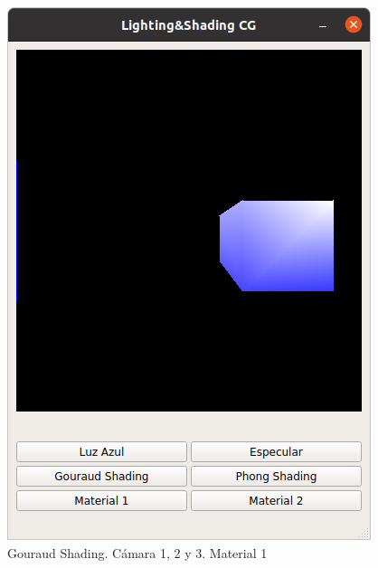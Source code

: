 \documentclass[12pt]{article}
\begin{document}
\begin{figure}[H]
\includegraphics[scale=0.5]{images/ej3.png}
\caption{Gouraud Shading. Cámara 1, 2 y 3. Material 1}
\end{figure}
\end{document}
